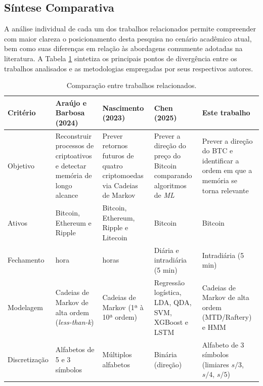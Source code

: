 \documentclass[
    12pt,                %
    openright,           %
    oneside,             %
    a4paper,             %
    english,             %
    brazil               %
]{abntex2}
\begin{document}
\subsection{Síntese Comparativa}

A análise individual de cada um dos trabalhos relacionados permite compreender com maior clareza o posicionamento desta pesquisa no cenário acadêmico atual, bem como suas diferenças em relação às abordagens comumente adotadas na literatura. A Tabela \ref{tab:tabela_um} sintetiza os principais pontos de divergência entre os trabalhos analisados e as metodologias empregadas por seus respectivos autores.

\begin{table}[htb]
    \centering
    \caption{Comparação entre trabalhos relacionados.}
    \label{tab:tabela_um}
    \footnotesize
    \renewcommand{\arraystretch}{1.25}
    \setlength{\tabcolsep}{4pt}
        \begin{tabularx}{\textwidth}{%
            >{\raggedright\arraybackslash}p{1.7cm}%
            >{\raggedright\arraybackslash}X%
            >{\raggedright\arraybackslash}X%
            >{\raggedright\arraybackslash}X%
            >{\raggedright\arraybackslash}X}
        \toprule
        \textbf{Critério} & \textbf{Araújo e Barbosa (2024)} & \textbf{Nascimento (2023)} & \textbf{Chen (2025)} & \textbf{Este trabalho} \\
        \midrule
        Objetivo & Reconstruir processos de criptoativos e detectar memória de longo alcance & Prever retornos futuros de quatro criptomoedas via Cadeias de Markov & Prever a direção do preço do Bitcoin comparando algoritmos de \textit{ML} & Prever a direção do BTC e identificar a ordem em que a memória se torna relevante \\
        \addlinespace
        Ativos & Bitcoin, Ethereum e Ripple & Bitcoin, Ethereum, Ripple e Litecoin & Bitcoin & Bitcoin \\
        \addlinespace
        Fechamento   & 1 hora & 24 horas & Diária e intradiária (5 min) & Intradiária (5 min) \\
        \addlinespace
        Modelagem & Cadeias de Markov de alta ordem (\textit{less-than-k}) & Cadeias de Markov (1ª à 10ª ordem) & Regressão logística, LDA, QDA, SVM, XGBoost e LSTM & Cadeias de Markov de alta ordem (MTD/Raftery) e HMM \\
        \addlinespace
        Discretização & Alfabetos de 5 e 3 símbolos & Múltiplos alfabetos & Binária (direção) & Alfabeto de 3 símbolos (limiares $s/3$, $s/4$, $s/5$) \\

\end{tabularx}
\end{table}
\end{document}
